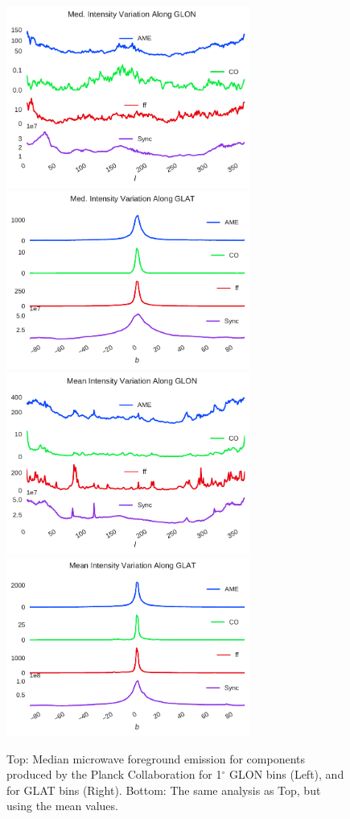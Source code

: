 \documentclass[preprint2,longabstract]{aastex}
\begin{document}
      \begin{figure}
        \label{fig:MWCompsbyGLOTandGLON}
        \includegraphics[width=80mm]{../Plots/CommanderByGLON_median.pdf}
        \includegraphics[width=80mm]{../Plots/CommanderByGLAT_median.pdf}
        \includegraphics[width=80mm]{../Plots/CommanderByGLON_mean.pdf}
        \includegraphics[width=80mm]{../Plots/CommanderByGLAT_mean.pdf}
        \centering
        \caption{Top: Median microwave foreground emission for components produced by the Planck Collaboration for 1$^{\circ}$ GLON bins (Left), and for GLAT bins (Right). Bottom: The same analysis as Top, but using the mean values. }
      \end{figure}
\end{document}
